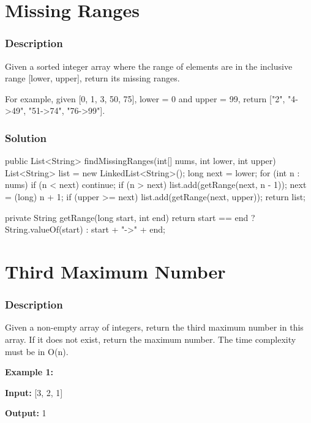 \newpage

\section{Missing Ranges} %

\subsubsection{Description}
Given a sorted integer array where the range of elements are in the inclusive range [lower, upper], return its missing ranges.

For example, given [0, 1, 3, 50, 75], lower = 0 and upper = 99, return ["2", "4->49", "51->74", "76->99"].
\subsubsection{Solution}

\begin{Code}
public List<String> findMissingRanges(int[] nums, int lower, int upper) {
    List<String> list = new LinkedList<String>();
    long next = lower;
    for (int n : nums) {
        if (n < next) {
            continue;
        }
        if (n > next) {
            list.add(getRange(next, n - 1));
        }
        next = (long) n + 1;
    }
    if (upper >= next) {
        list.add(getRange(next, upper));
    }
    return list;
}

private String getRange(long start, int end) {
    return start == end ? String.valueOf(start) : start + "->" + end;
}
\end{Code}

\newpage

\section{Third Maximum Number} %

\subsubsection{Description}
Given a non-empty array of integers, return the third maximum number in this array. If it does not exist, return the maximum number. The time complexity must be in O(n).

\textbf{Example 1:}

\textbf{Input:} [3, 2, 1]

\textbf{Output:} 1

